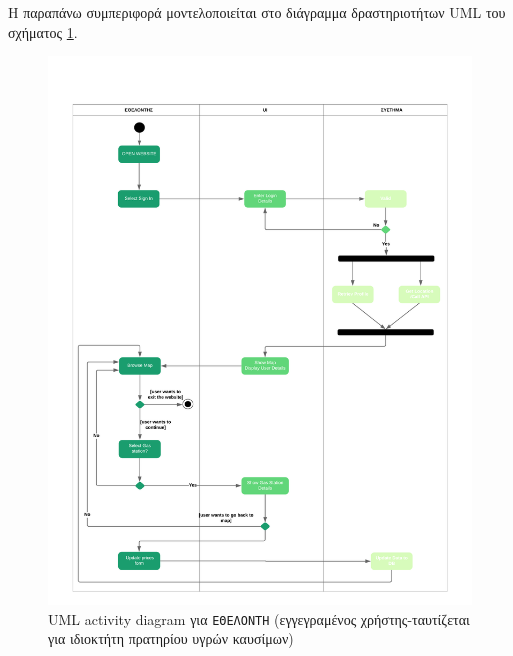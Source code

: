 Η παραπάνω συμπεριφορά μοντελοποιείται στο διάγραμμα δραστηριοτήτων UML του σχήματος  \ref{volunteer2}.
\begin{figure}
	\centering\includegraphics[width = \linewidth]{uml/volunteer.png}
	\caption{UML activity diagram για \texttt{ΕΘΕΛΟΝΤΗ} (εγγεγραμένος χρήστης-ταυτίζεται για ιδιοκτήτη πρατηρίου υγρών καυσίμων)}
	\label{volunteer2}
\end{figure}